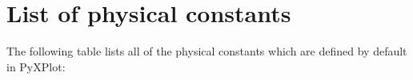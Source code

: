 %
%
%
%
%



\chapter{List of physical constants}
\label{ch:constants}

The following table lists all of the physical constants which are defined by default in PyXPlot:

